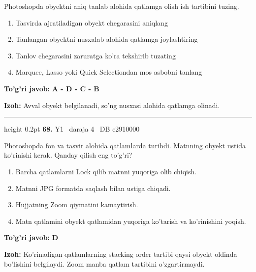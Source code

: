 \documentclass[10pt,a4paper,oneside]{article}
\begin{document}
\par
Photoshopda obyektni aniq tanlab alohida qatlamga olish ish tartibini tuzing.
\begin{enumerate}[label=\Alph*),leftmargin=9mm]
\item Tasvirda ajratiladigan obyekt chegarasini aniqlang
\item Tanlangan obyektni nusxalab alohida qatlamga joylashtiring
\item Tanlov chegarasini zaruratga ko'ra tekshirib tuzating
\item Marquee, Lasso yoki Quick Selectiondan mos asbobni tanlang
\end{enumerate}
\begin{tcolorbox}[enhanced,breakable,colback=teal!4,colframe=teal!45!black,boxrule=0.45pt,arc=1.2mm,left=2.8mm,right=2.8mm,top=2mm,bottom=2mm,before skip=2mm,after skip=2mm]
\textbf{\color{teal}To'g'ri javob:} \textbf{A - D - C - B}
\par\smallskip
\textbf{Izoh:} Avval obyekt belgilanadi, so'ng nusxasi alohida qatlamga olinadi.
\end{tcolorbox}
\vspace{2mm}\hrule height 0.2pt \vspace{4mm}
\hypertarget{q68}{\textbf{\color{ink}68.}}  {\color{muted}\scriptsize Y1 \textbullet\ daraja 4 \textbullet\ DB e2910000}
\par
Photoshopda fon va tasvir alohida qatlamlarda turibdi. Matnning obyekt ustida ko'rinishi kerak. Qanday qilish eng to'g'ri?
\begin{enumerate}[label=\Alph*),leftmargin=9mm]
\item Barcha qatlamlarni Lock qilib matnni yuqoriga olib chiqish.
\item Matnni JPG formatda saqlash bilan ustiga chiqadi.
\item Hujjatning Zoom qiymatini kamaytirish.
\item Matn qatlamini obyekt qatlamidan yuqoriga ko'tarish va ko'rinishini yoqish.
\end{enumerate}
\begin{tcolorbox}[enhanced,breakable,colback=teal!4,colframe=teal!45!black,boxrule=0.45pt,arc=1.2mm,left=2.8mm,right=2.8mm,top=2mm,bottom=2mm,before skip=2mm,after skip=2mm]
\textbf{\color{teal}To'g'ri javob:} \textbf{D}
\par\smallskip
\textbf{Izoh:} Ko'rinadigan qatlamlarning stacking order tartibi qaysi obyekt oldinda bo'lishini belgilaydi. Zoom manba qatlam tartibini o'zgartirmaydi.
\end{tcolorbox}
\end{document}
